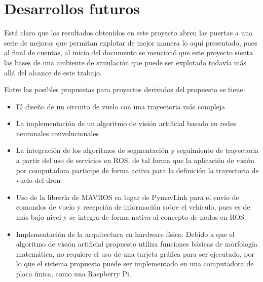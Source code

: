 \section{Desarrollos futuros}

Está claro que los resultados obtenidos en este proyecto abren las puertas a una serie de mejoras que permitan explotar de mejor manera lo aquí presentado, pues al final de cuentas, al inicio del documento se mencionó que este proyecto sienta las bases de una ambiente de simulación que puede ser explotado todavía más allá del alcance de este trabajo. 

Entre las posibles propuestas para proyectos derivados del propuesto se tiene:

\begin{itemize}
    \item El diseño de un circuito de vuelo con una trayectoria más compleja
    \item La implementación de un algoritmo de visión artificial basado en redes neuronales convolucionales
    \item La integración de los algoritmos de segmentación y seguimiento de trayectoria a partir del uso de servicios en ROS, de tal forma que la aplicación de visión por computadora participe de forma activa para la definición la trayectoria de vuelo del dron
    \item Uso de la librería de MAVROS en lugar de PymavLink para el envío de comandos de vuelo y recepción de información sobre el vehículo, pues es de más bajo nivel y se integra de forma nativa al concepto de nodos en ROS.
    \item Implementación de la arquitectura en hardware físico. Debido a que el algoritmo de visión artificial propuesto utiliza funciones básicas de morfología matemática, no requiere el uso de una tarjeta gráfica para ser ejecutado, por lo que el sistema propuesto puede ser implementado en una computadora de placa única, como una Raspberry Pi.
\end{itemize}